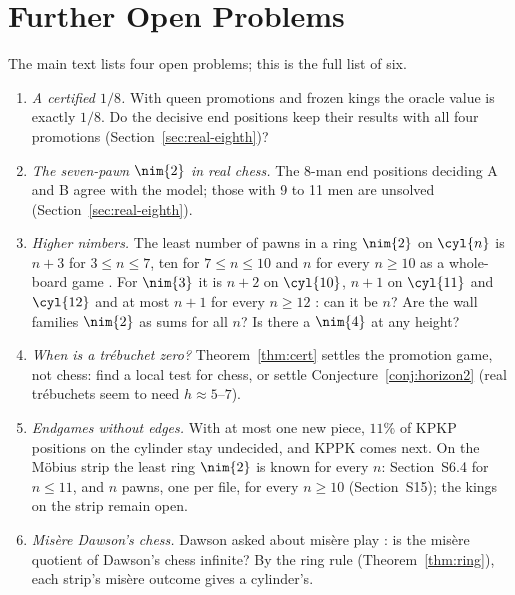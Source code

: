 \section{Further Open Problems}\label{S-open}
The main text lists four open problems; this is the full list of six.
\begin{enumerate}
\item \emph{A certified $1/8$.} With queen promotions and frozen kings the oracle value is exactly $1/8$. Do
  the decisive end positions keep their results with all four promotions (Section~\ref{sec:real-eighth})?
\item \emph{The seven-pawn $\nim{2}$ in real chess.} The 8-man end positions deciding A and B agree with the
  model; those with 9 to 11 men are unsolved
  (Section~\ref{sec:real-eighth}).
\item \emph{Higher nimbers.} The least number of pawns in a ring $\nim{2}$ on $\cyl{n}$ is $n+3$ for $3\le n\le7$,
  ten for $7\le n\le10$  and $n$ for every $n\ge10$ as a whole-board game . For $\nim{3}$ it is $n+2$ on $\cyl{10}$, $n+1$ on $\cyl{11}$ and $\cyl{12}$  and at
  most $n+1$ for every $n\ge12$ : can it be $n$? Are the wall
  families $\nim{2}$ as sums for all $n$? Is there a $\nim{4}$ at any height?
\item \emph{When is a tr\'ebuchet zero?} Theorem~\ref{thm:cert} settles the promotion game, not chess: find a
  local test for chess, or settle Conjecture~\ref{conj:horizon2} (real tr\'ebuchets seem to need $h\approx5$--$7$).
\item \emph{Endgames without edges.} With at most one new piece, $11\%$ of KPKP positions on the cylinder
  stay undecided, and KPPK comes next. On the M\"obius strip the least ring $\nim{2}$ is known for every $n$: Section~S6.4 for $n\le11$,
  and $n$ pawns, one per file, for every $n\ge10$ (Section~S15); the kings on the strip remain open.
\item \emph{Mis\`ere Dawson's chess.} Dawson asked about mis\`ere play \cite{Dawson1935}: is the mis\`ere
  quotient \cite{PlambeckSiegel2008} of Dawson's chess infinite? By the ring rule (Theorem~\ref{thm:ring}), each
  strip's mis\`ere outcome gives a cylinder's.
\end{enumerate}
